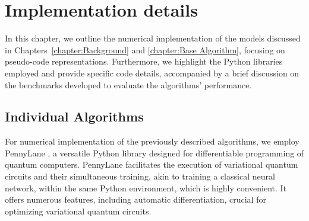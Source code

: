 
\chapter{Implementation details}
\label{chapter:implementation}

In this chapter, we outline the numerical implementation of the models discussed in Chapters~\ref{chapter:Background} and \ref{chapter:Base Algorithm}, focusing on pseudo-code representations. Furthermore, we highlight the Python libraries employed and provide specific code details, accompanied by a brief discussion on the benchmarks developed to evaluate the algorithms' performance.



\section{Individual Algorithms}
\label{section:Individual_Algorithms}

For numerical implementation of the previously described algorithms, we employ PennyLane \cite{Pennylane}, a versatile Python library designed for differentiable programming of quantum computers. PennyLane facilitates the execution of variational quantum circuits and their simultaneous training, akin to training a classical neural network, within the same Python environment, which is highly convenient. It offers numerous features, including automatic differentiation, crucial for optimizing variational quantum circuits.

